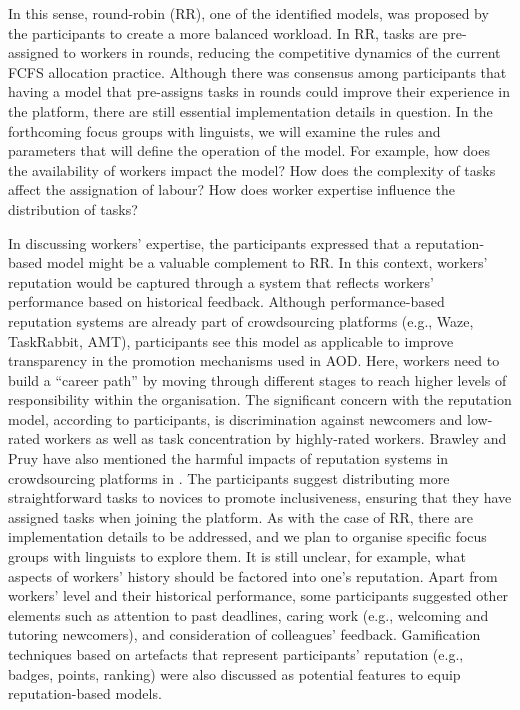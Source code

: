 In this sense, round-robin (RR), one of the identified models, was proposed by the participants to create a more balanced workload. In RR, tasks are pre-assigned to workers in rounds, reducing the competitive dynamics of the current FCFS allocation practice. Although there was consensus among  participants that having a model that pre-assigns tasks in rounds could improve their experience in the platform, there are still essential implementation details in question. In the forthcoming focus groups with linguists, we will examine the rules and parameters that will define the operation of the model. For example, how does the availability of workers impact the model? How does the complexity of tasks affect the assignation of labour? How does worker expertise influence the distribution of tasks?

In discussing workers' expertise, the participants expressed that a reputation-based model might be a valuable complement to RR. In this context, workers' reputation would be captured through a system that reflects workers' performance based on historical feedback. Although performance-based reputation systems are already part of crowdsourcing platforms (e.g., Waze, TaskRabbit, AMT), participants see this model as applicable to improve transparency in the promotion mechanisms used in AOD. Here, workers need to build a ``career path'' by moving through different stages to reach higher levels of responsibility within the organisation. The significant concern with the reputation model, according to participants, is discrimination against newcomers and low-rated workers as well as task concentration by highly-rated workers. Brawley and Pruy have also mentioned the harmful impacts of reputation systems in crowdsourcing platforms in \cite{brawley2016work}. The participants suggest distributing more straightforward tasks to novices to promote inclusiveness, ensuring that they have assigned tasks when joining the platform.
As with the case of RR, there are implementation details to be addressed, and we plan to organise specific focus groups with linguists to explore them. It is still unclear, for example, what aspects of workers' history should be factored into one's reputation. Apart from workers' level and their historical performance, some participants suggested other elements such as attention to past deadlines, caring work \cite{10.3389/fhumd.2021.618207} (e.g., welcoming and tutoring newcomers), and consideration of colleagues' feedback. Gamification techniques based on artefacts that represent participants' reputation (e.g., badges, points, ranking) \cite{feng2018gamification} were also discussed as potential features to equip reputation-based models. 

